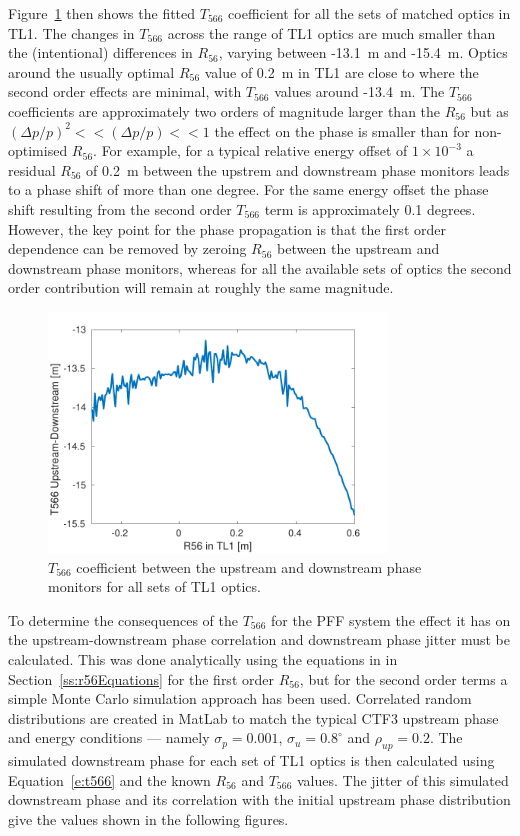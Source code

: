 Figure~\ref{f:t566TotVsr56TL1} then shows the fitted \(T_{566}\) coefficient for all the sets of matched optics in TL1. The changes in \(T_{566}\) across the range of TL1 optics are much smaller than the (intentional) differences in \(R_{56}\), varying between -13.1~m and -15.4~m. Optics around the usually optimal \(R_{56}\) value of 0.2~m in TL1  are close to where the second order effects are minimal, with \(T_{566}\) values around -13.4~m. The \(T_{566}\) coefficients are approximately two orders of magnitude larger than the \(R_{56}\) but as \(\left(\Delta p / p\right)^2 << \left(\Delta p / p\right) << 1\) the effect on the phase is smaller than for non-optimised \(R_{56}\). For example, for a typical relative energy offset of \(1 \times 10^{-3}\) a residual \(R_{56}\) of 0.2~m between the upstrem and downstream phase monitors leads to a phase shift of more than one degree. For the same energy offset the phase shift resulting from the second order \(T_{566}\) term is approximately 0.1 degrees. However, the key point for the phase propagation is that the first order dependence can be removed by zeroing \(R_{56}\) between the upstream and downstream phase monitors, whereas for all the available sets of optics the second order contribution will remain at roughly the same magnitude.

\begin{figure}
  \centering
  \includegraphics[width=0.8\textwidth]{Figures/propagation/t566TotVsr56TL1}
  \caption{\(T_{566}\) coefficient between the upstream and downstream phase monitors for all sets of TL1 optics.}
  \label{f:t566TotVsr56TL1}
\end{figure}

To determine the consequences of the \(T_{566}\) for the PFF system the effect it has on the upstream-downstream phase correlation and downstream phase jitter must be calculated. This was done analytically using the equations in in Section~\ref{ss:r56Equations} for the first order \(R_{56}\), but for the second order terms a simple Monte Carlo simulation approach has been used. Correlated random distributions are created in MatLab to match the typical CTF3 upstream phase and energy conditions --- namely \(\sigma_p = 0.001\), \(\sigma_u = 0.8^\circ\) and \(\rho_{up} = 0.2\). The simulated downstream phase for each set of TL1 optics is then calculated using Equation~\ref{e:t566} and the known \(R_{56}\) and \(T_{566}\) values. The jitter of this simulated downstream phase and its correlation with the initial upstream phase distribution give the values shown in the following figures.

